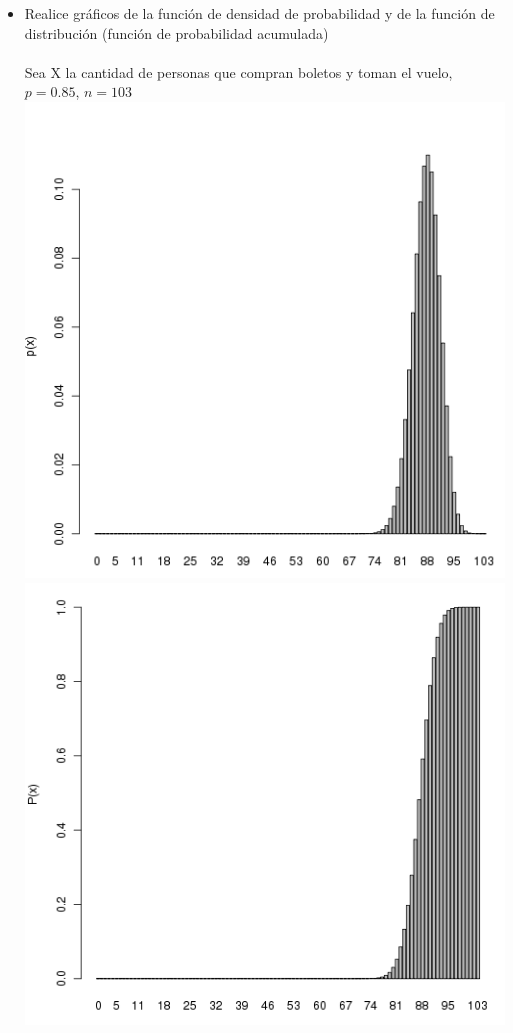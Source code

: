 \begin{itemize}
	\item Realice gr\'aficos de la funci\'on de densidad de probabilidad y de la funci\'on de distribuci\'on (funci\'on de probabilidad acumulada)\\ \\
	Sea X la cantidad de personas que compran boletos y toman el vuelo, $p = 0.85$, $n = 103$\\
	\includegraphics[scale=0.5]{images/1_1-dbinom}\\ %
	\includegraphics[scale=0.5]{images/1_1-pbinom}\\ %

\end{itemize}
